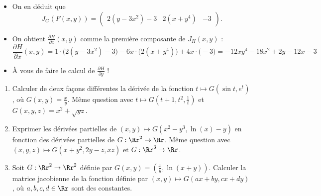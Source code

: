\documentclass[11pt, class=report,crop=false]{standalone}
\begin{document}
\begin{exemple}
\begin{itemize}
  \item On en déduit que
$$J_G (F(x,y)) =
\begin{pmatrix}
2(y-3x^2)-3 &  2(x+y^4) &  -3
\end{pmatrix}. 
$$
 
  \item On obtient $\frac{\partial H}{\partial x}(x,y)$ comme la première composante de $J_H (x,y)$ :
$$
\frac{\partial H}{\partial x}(x,y)
= 
1 \cdot \big( 2(y-3x^2)-3 \big)
-6x \cdot  \big( 2(x+y^4) \big)
+4x \cdot  \big( -3 \big)
=  -12xy^4-18x^2+2y-12x-3
$$
  
  \item À vous de faire le calcul de $\frac{\partial H}{\partial y}$ !

\end{itemize}

\end{exemple}




\begin{miniexercices}
\sauteligne
\begin{enumerate}
  \item Calculer de deux façons différentes la dérivée de la fonction
  $t \mapsto G(\sin t, e^t)$, où $G(x,y)=\frac xy$. 
  Même question avec $t \mapsto G(t+1,t^2,\frac1t)$ et $G(x,y,z) = x^2+\sqrt{yz}$.
  
  \item Exprimer les dérivées partielles de $(x,y) \mapsto G(x^2-y^3,\ln(x)-y)$ en fonction des dérivées partielles de $G : \Rr^2 \to \Rr$. Même question avec $(x,y,z) \mapsto G(x+y^2,2y-z,xz)$
  et $G : \Rr^3 \to \Rr$.
  
  \item Soit $G : \Rr^2 \to \Rr^2$ définie par $G(x,y) = \left( \frac{x}{y}, \ln(x+y) \right)$.
  Calculer la matrice jacobienne de la fonction définie par $(x,y) \mapsto G(ax+by,cx+dy)$, où $a,b,c,d \in \Rr$ sont des constantes.
\end{enumerate}
\end{miniexercices}



 


\finchapitre 
\end{document}

